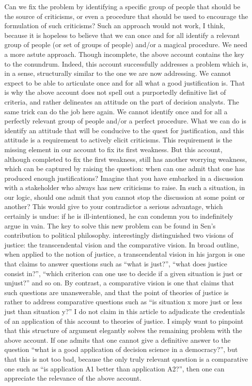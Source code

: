 \documentclass[preprint,11pt]{elsarticle}
\begin{document}
Can we fix the problem by identifying a specific group of people that should be the source of criticisms, or even a procedure that should be used to encourage the formulation of such criticisms? Such an approach would not work, I think, because it is hopeless to believe that we can once and for all identify a relevant group of people (or set of groups of people) and/or a magical procedure. We need a more astute approach. Though incomplete, the above account contains the key to the conundrum. Indeed, this account successfully addresses a problem which is, in a sense, structurally similar to the one we are now addressing. We cannot expect to be able to articulate once and for all what a good justification is. That is why the above account does not spell out a purportedly definitive list of criteria, and rather delineates an attitude on the part of decision analysts. The same trick can do the job here again. We cannot identify once and for all a perfectly relevant group of people and/or a perfect procedure. What we can do is identify an attitude that will be conducive to the quest for justification, and this attitude is a requirement to actively elicit criticisms. This requirement is the missing element in our account to fix its first weakness.
But this account, although completed to fix the first weakness, still has another worrying weakness, which can be captured by raising the question: when can one admit that one has produced enough justifications? Imagine that you have embarked in a discussion with a stakeholder who always has new criticisms to raise. In such a situation, in our logic, should one admit that you cannot stop the discussion at some point or another? This would give to your contradictor a serious advantage, which certainly is undue: if he is ill-intentioned, he can condemn you to indefinitely argue in vain. The key to solve this new problem can be found in Sen’s contribution to political philosophy. \cite{sen_idea_2009} interestingly distinguished two visions of justice: the transcendental vision and the comparative vision. In broad outline, when applied to the notion of justice, a transcendental vision in his jargon is one that claims to answer questions such as “what is just?”, “what does justice consist in?”, “which criterion can one use to decide if a given situation is just or unjust?” and so on. By contrast, a comparative vision is one that claims that such questions are unanswerable, and that the point of theories of justice is rather to address comparative questions such as “is situation x more just or less just than situation y?” I do not claim in this article to adjudicate the credentials of an application of this account to theories of justice. I simply want to pinpoint that this structure of argument elegantly solves the remaining problem with the above account. If one admits that one cannot give a definitive answer to the question “what is a good application of decision science in a democracy?”, but that this is not too bad, because the only truly relevant question is a comparative one such as “is application A1 better than application A2?”, then one can appreciate the relevance of the above account.
\end{document}

